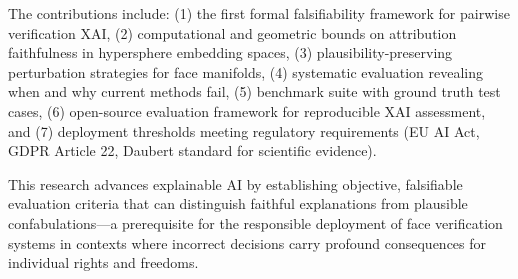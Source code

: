 The contributions include: (1) the first formal falsifiability framework for pairwise verification XAI, (2) computational and geometric bounds on attribution faithfulness in hypersphere embedding spaces, (3) plausibility-preserving perturbation strategies for face manifolds, (4) systematic evaluation revealing when and why current methods fail, (5) benchmark suite with ground truth test cases, (6) open-source evaluation framework for reproducible XAI assessment, and (7) deployment thresholds meeting regulatory requirements (EU AI Act, GDPR Article 22, Daubert standard for scientific evidence).

This research advances explainable AI by establishing objective, falsifiable evaluation criteria that can distinguish faithful explanations from plausible confabulations---a prerequisite for the responsible deployment of face verification systems in contexts where incorrect decisions carry profound consequences for individual rights and freedoms.
